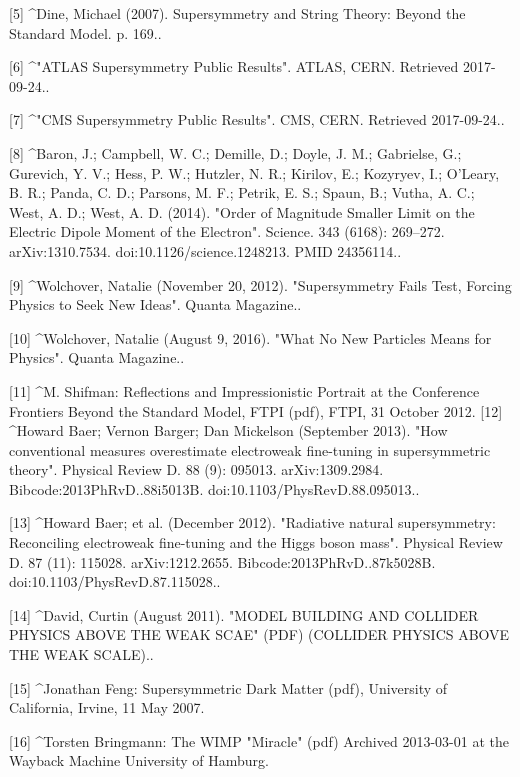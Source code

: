 [5]
^Dine, Michael (2007). Supersymmetry and String Theory: Beyond the Standard Model. p. 169..

[6]
^"ATLAS Supersymmetry Public Results". ATLAS, CERN. Retrieved 2017-09-24..

[7]
^"CMS Supersymmetry Public Results". CMS, CERN. Retrieved 2017-09-24..

[8]
^Baron, J.; Campbell, W. C.; Demille, D.; Doyle, J. M.; Gabrielse, G.; Gurevich, Y. V.; Hess, P. W.; Hutzler, N. R.; Kirilov, E.; Kozyryev, I.; O'Leary, B. R.; Panda, C. D.; Parsons, M. F.; Petrik, E. S.; Spaun, B.; Vutha, A. C.; West, A. D.; West, A. D. (2014). "Order of Magnitude Smaller Limit on the Electric Dipole Moment of the Electron". Science. 343 (6168): 269–272. arXiv:1310.7534. doi:10.1126/science.1248213. PMID 24356114..

[9]
^Wolchover, Natalie (November 20, 2012). "Supersymmetry Fails Test, Forcing Physics to Seek New Ideas". Quanta Magazine..

[10]
^Wolchover, Natalie (August 9, 2016). "What No New Particles Means for Physics". Quanta Magazine..

[11]
^M. Shifman: Reflections and Impressionistic Portrait at the Conference Frontiers Beyond the Standard Model, FTPI (pdf), FTPI, 31 October 2012.
[12]
^Howard Baer; Vernon Barger; Dan Mickelson (September 2013). "How conventional measures overestimate electroweak fine-tuning in supersymmetric theory". Physical Review D. 88 (9): 095013. arXiv:1309.2984. Bibcode:2013PhRvD..88i5013B. doi:10.1103/PhysRevD.88.095013..

[13]
^Howard Baer; et al. (December 2012). "Radiative natural supersymmetry: Reconciling electroweak fine-tuning and the Higgs boson mass". Physical Review D. 87 (11): 115028. arXiv:1212.2655. Bibcode:2013PhRvD..87k5028B. doi:10.1103/PhysRevD.87.115028..

[14]
^David, Curtin (August 2011). "MODEL BUILDING AND COLLIDER PHYSICS ABOVE THE WEAK SCAE" (PDF) (COLLIDER PHYSICS ABOVE THE WEAK SCALE)..

[15]
^Jonathan Feng: Supersymmetric Dark Matter (pdf), University of California, Irvine, 11 May 2007.

[16]
^Torsten Bringmann: The WIMP "Miracle" (pdf) Archived 2013-03-01 at the Wayback Machine University of Hamburg.

